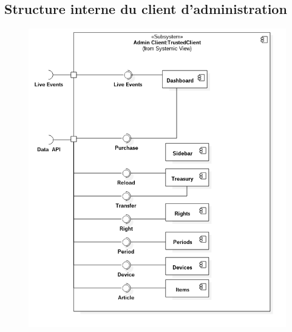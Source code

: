 \newpage
\subsection{Structure interne du client d'administration}
    \begin{figure}[h]
        \centering
        \includegraphics[scale=0.55]{./assets/UML/admin_client.png}
        \label{admin_client}
    \end{figure}